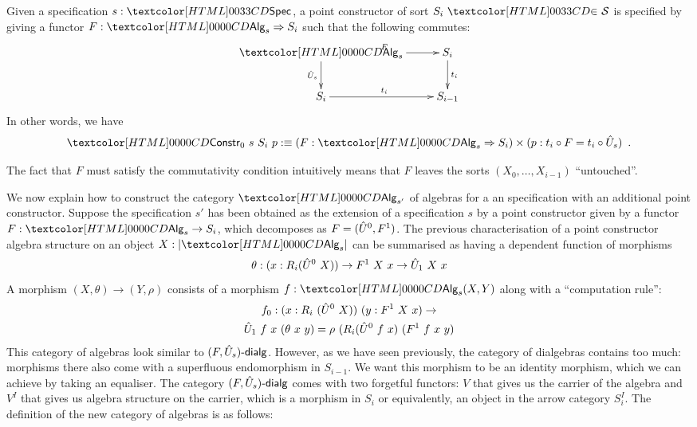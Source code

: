 \begin{definition}
  Given a specification $s : \specty$, a point constructor of sort
  $\sortsin{S_i}{\Ss}$ is specified by giving a functor
  $F : \Func{\Alg_s}{S_i}$ such that the following commutes:
  $$
  \xymatrix{
    \Alg_s \ar[r]^{F} \ar[d]_{\extendfunc{U}_s} &S_i \ar[d]^{t_i} \\
    S_i \ar[r]^{t_i} &S_{i-1}
  }
  $$
  In other words, we have
  $$
  \Constr_0\ s\ S_i\ p \ddefeq (F : \Func{\Alg_s}{S_i}) \times (p : t_i \circ F = t_i \circ \extendfunc{U}_s) \enspace .
  $$
\end{definition} 

The fact that $F$ must satisfy the commutativity condition intuitively
means that $F$ leaves the sorts $(X_0, \hdots, X_{i-1})$ ``untouched''.

We now explain how to construct the category $\Alg_{s'}$ of algebras
for a an specification with an additional point constructor. Suppose
the specification $s'$ has been obtained as the extension of a
specification $s$ by a point constructor given by a functor
$F : \Alg_s \to S_i$, which decomposes as $F = (\hat{U}^0, F^1)$. The
previous characterisation of a point constructor algebra structure on
an object $X : | \Alg_s |$ can be summarised as having a dependent
function of morphisms
\[
\theta : (x : R_i (\extendfunc{U}^0\ X)) \to F^1\ X\ x \to \extendfunc{U}_1\ X\ x
\]
A morphism $(X,\theta) \to (Y,\rho)$ consists of a morphism
$f : \Alg_s(X,Y)$ along with a ``computation rule'':
\begin{multline*}
f_0 : (x : R_i \ (\extendfunc{U}^0\ X))\ (y : F^1\ X\ x) \to \\ 
\extendfunc{U}_1\ f\ x\ (\theta\ x\ y) = \rho\ (R_i(\extendfunc{U}^0\ f\ x)\ (F^1\ f\ x\ y)
\end{multline*}
This category of algebras look similar to
$\dialgcat{F}{\extendfunc{U}_s}$. However, as we have seen previously, the
category of dialgebras contains too much: morphisms there also come
with a superfluous endomorphism in $S_{i-1}$. We want this morphism to
be an identity morphism, which we can achieve by taking an
equaliser. The category $\dialgcat{F}{\extendfunc{U}_s}$ comes with two
forgetful functors: $V$ that gives us the carrier of the algebra and
$V^I$ that gives us algebra structure on the carrier, which is a
morphism in $S_i$ or equivalently, an object in the arrow category
$S_i^I$. The definition of the new category of algebras is as follows:

